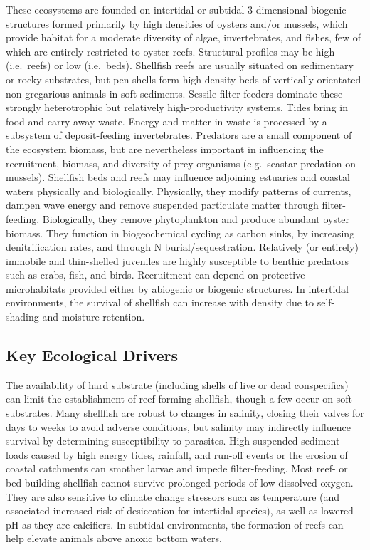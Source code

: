 \documentclass[
  letterpaper,
  DIV=11,
  numbers=noendperiod]{scrartcl}
\begin{document}
These ecosystems are founded on intertidal or subtidal 3-dimensional
biogenic structures formed primarily by high densities of oysters and/or
mussels, which provide habitat for a moderate diversity of algae,
invertebrates, and fishes, few of which are entirely restricted to
oyster reefs. Structural profiles may be high (i.e.~reefs) or low
(i.e.~beds). Shellfish reefs are usually situated on sedimentary or
rocky substrates, but pen shells form high-density beds of vertically
orientated non-gregarious animals in soft sediments. Sessile
filter-feeders dominate these strongly heterotrophic but relatively
high-productivity systems. Tides bring in food and carry away waste.
Energy and matter in waste is processed by a subsystem of
deposit-feeding invertebrates. Predators are a small component of the
ecosystem biomass, but are nevertheless important in influencing the
recruitment, biomass, and diversity of prey organisms (e.g.~seastar
predation on mussels). Shellfish beds and reefs may influence adjoining
estuaries and coastal waters physically and biologically. Physically,
they modify patterns of currents, dampen wave energy and remove
suspended particulate matter through filter-feeding. Biologically, they
remove phytoplankton and produce abundant oyster biomass. They function
in biogeochemical cycling as carbon sinks, by increasing denitrification
rates, and through N burial/sequestration. Relatively (or entirely)
immobile and thin-shelled juveniles are highly susceptible to benthic
predators such as crabs, fish, and birds. Recruitment can depend on
protective microhabitats provided either by abiogenic or biogenic
structures. In intertidal environments, the survival of shellfish can
increase with density due to self-shading and moisture retention.

\subsection{Key Ecological Drivers}\label{key-ecological-drivers-29}

The availability of hard substrate (including shells of live or dead
conspecifics) can limit the establishment of reef-forming shellfish,
though a few occur on soft substrates. Many shellfish are robust to
changes in salinity, closing their valves for days to weeks to avoid
adverse conditions, but salinity may indirectly influence survival by
determining susceptibility to parasites. High suspended sediment loads
caused by high energy tides, rainfall, and run-off events or the erosion
of coastal catchments can smother larvae and impede filter-feeding. Most
reef- or bed-building shellfish cannot survive prolonged periods of low
dissolved oxygen. They are also sensitive to climate change stressors
such as temperature (and associated increased risk of desiccation for
intertidal species), as well as lowered pH as they are calcifiers. In
subtidal environments, the formation of reefs can help elevate animals
above anoxic bottom waters.
\end{document}

